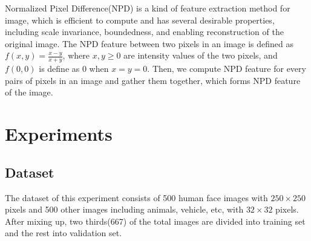 \documentclass[journal, a4paper]{IEEEtran}
\begin{document}
Normalized Pixel Difference(NPD) is a kind of feature extraction method for image, which is efficient to compute and has several desirable properties, including scale invariance, boundedness, and enabling reconstruction of the original image.
The NPD feature between two pixels in an image is defined as $f(x,y)=\frac{x-y}{x+y}$, where $x,y\geqslant0$ are intensity values of the two pixels, and $f(0,0)$ is define as 0 when $x=y=0$.
Then, we compute NPD feature for every pairs of pixels in an image and gather them together, which forms NPD feature of the image.

\section{Experiments}
\subsection{Dataset}
The dataset of this experiment consists of 500 human face images with $250\times250$ pixels and 500 other images including animals, vehicle, etc, with $32\times32$ pixels.
After mixing up, two thirds(667) of the total images are divided into training set and the rest into validation set.
\end{document}
